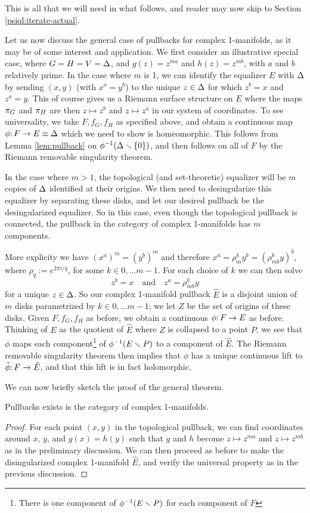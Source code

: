 This is all that we will need in what follows, and reader may now skip to Section \ref{psiql:iterate-actual}.

Let us now discuss the general case of pullbacks for complex 1-manifolds,
as it may be of some interest and application.
We first consider an illustrative special case,
where $G = H = V = \Delta$, 
and $g(z) = z^{ma}$ and $h(z) = z^{mb}$, with $a$ and $b$ relatively prime.
In the case where $m$ is 1,
we can identify the equalizer $E$ with $\Delta$ by sending $(x, y)$ (with $x^a = y^b$) to the unique $z \in \Delta$ for which $z^b = x$ and $z^a = y$.
This of course gives us a Riemann surface structure on $E$ where the maps $\pi_G$ and $\pi_H$ are then $z \mapsto z^b$ and $z \mapsto z^a$ in our system of coordinates. 
To see universality, we take $F, f_G, f_H$ as specified above, and obtain a continuous map $\phi\mathpunct: F \to E \equiv \Delta$ which we need to show is homeomorphic. 
This follows from Lemma \ref{lem:pullback} on $\phi^{-1}(\Delta \smallsetminus \{ 0 \})$, and then follows on all of $F$ by the Riemann removable singularity theorem.

In the case where $m > 1$,
the topological (and set-theoretic) equalizer will be $m$ copies of $\Delta$ identified at their origins. 
We then need to desingularize this equalizer by separating these disks, 
and let our desired pullback be the desingularized equalizer.
So in this case, 
even though the topological pullback is connected,
the pullback in the category of complex 1-manifolds has $m$ components. 

More explicity we have $(x^a)^m = (y^b)^m$ 
and therefore $x^a = \rho^k_m y^b = (\rho^k_{mb} y)^b$, where $\rho_q := e^{2 \pi i/q}$, for some $k \in 0, \ldots m-1$. 
For each choice of $k$ we can then solve 
$$z^b = x \quad \text{and} \quad z^a = \rho^k_{mb} y$$
for a unique $z \in \Delta$.
So our complex 1-manifold pullback $\hat E$ is a disjoint union of $m$ disks parametrized by $k \in 0, \ldots m-1$;
we let $Z$ be the set of origins of these disks.
Given $F, f_G, f_H$ as before, 
we obtain a continuous $\phi\mathpunct: F\to E$ as before.
Thinking of $E$ as the quotient of $\hat E$ where $Z$ is collapsed to a point $P$,
we see that $\phi$ maps each component\footnote{There is one component of $\phi^{-1}(E \smallsetminus P)$ for each component of $F$}
of $\phi^{-1}(E \smallsetminus P)$ to a component of $\hat E$. 
The Riemann removable singularity theorem then implies that $\phi$ has a unique continuous lift to $\hat \phi\mathpunct: F \to \hat E$, 
and that this lift is in fact holomorphic.

We can now briefly sketch the proof of the general theorem.
\begin{theorem}
Pullbacks exists is the category of complex 1-manifolds.
\end{theorem}
\begin{proof}
For each point $(x, y)$ in the topological pullback, we can find coordinates around $x$, $y$, and $g(x) = h(y)$ such that $g$ and $h$ become $z\mapsto z^{ma}$ and $z \mapsto z^{mb}$ as in the preliminary discussion. We can then proceed as before to make the disingularized complex 1-manifold $\hat E$, and verify the universal property as in the previous discussion.
\end{proof}



